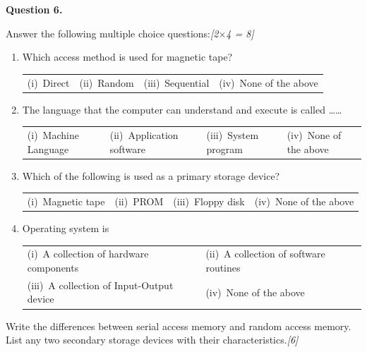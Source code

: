 \documentclass[11pt,a4paper]{article}
\newcommand{\pts}[1]{\hfill   \textit{[#1]}}
\begin{document}
\noindent   \textbf{Question 6.}

\begin{parts}
  \item Answer the following multiple choice questions:\pts{2$ \times$4 = 8}
  
\begin{enumerate}[label=(\roman*),leftmargin=*]
    \item Which access method is used for magnetic tape?\\
    
\begin{tabular}{p{2.5cm}p{2.5cm}p{3cm}p{3cm}}
      (i)~Direct & (ii)~Random & (iii)~Sequential & (iv)~None of the above
    \end{tabular}
    
    \item The language that the computer can understand and execute is called \dots\dots\\
    
\begin{tabular}{p{3.5cm}p{3.5cm}p{3cm}p{3cm}}
      (i)~Machine Language & (ii)~Application software & (iii)~System program & (iv)~None of the above
    \end{tabular}
    
    \item Which of the following is used as a primary storage device?\\
    
\begin{tabular}{p{3cm}p{2.5cm}p{3cm}p{3cm}}
      (i)~Magnetic tape & (ii)~PROM & (iii)~Floppy disk & (iv)~None of the above
    \end{tabular}
    
    \item Operating system is\\
    
\begin{tabular}{p{5.5cm}p{5.5cm}}
      (i)~A collection of hardware components & (ii)~A collection of software routines \\
      (iii)~A collection of Input-Output device & (iv)~None of the above
    \end{tabular}
  \end{enumerate}
  \item Write the differences between serial access memory and random access memory. List any two secondary storage devices with their characteristics.\pts{6}
\end{parts}
\end{document}
